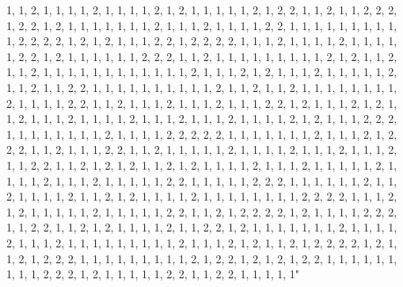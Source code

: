 \documentclass[
]{article}
\begin{document}
\begin{Schunk}
\begin{Soutput}
1, 1, 2, 1, 1, 1, 1, 2, 1, 1, 1, 1, 2, 1, 2, 1, 1, 1, 1, 1, 2, 1, 2, 2, 1, 1, 2, 1, 1, 2, 2, 2, 1, 2, 2, 1, 2, 1, 1, 1, 1, 1, 1, 1, 2, 1, 1, 1, 2, 1, 1, 1, 1, 2, 2, 1, 1, 1, 1, 1, 1, 1, 1, 1, 1, 2, 2, 2, 2, 1, 2, 1, 2, 1, 1, 1, 2, 2, 1, 2, 2, 2, 2, 1, 1, 1, 2, 1, 1, 1, 1, 2, 1, 1, 1, 1, 1, 2, 2, 1, 2, 1, 1, 1, 1, 1, 1, 2, 2, 2, 1, 1, 2, 1, 1, 1, 1, 1, 1, 1, 1, 1, 2, 1, 2, 1, 1, 2, 1, 1, 2, 1, 1, 1, 1, 1, 1, 1, 1, 1, 1, 1, 1, 2, 1, 1, 1, 2, 1, 2, 1, 1, 1, 2, 1, 1, 1, 1, 1, 2, 1, 1, 2, 1, 1, 2, 2, 1, 1, 1, 1, 1, 1, 1, 1, 1, 1, 2, 1, 1, 2, 1, 1, 2, 1, 1, 1, 1, 1, 1, 1, 1, 2, 1, 1, 1, 1, 2, 2, 1, 1, 2, 1, 1, 1, 2, 1, 1, 1, 2, 1, 1, 1, 2, 2, 1, 2, 1, 1, 1, 2, 1, 2, 1, 1, 2, 1, 1, 1, 2, 1, 1, 1, 1, 2, 1, 1, 1, 2, 1, 1, 1, 2, 1, 1, 1, 1, 2, 1, 2, 1, 1, 1, 2, 2, 2, 1, 1, 1, 1, 1, 1, 1, 1, 2, 1, 1, 1, 1, 2, 2, 2, 2, 2, 1, 1, 1, 1, 1, 1, 1, 2, 1, 1, 1, 2, 1, 2, 2, 2, 1, 1, 2, 1, 1, 1, 2, 2, 1, 1, 2, 1, 1, 1, 1, 1, 2, 1, 1, 1, 1, 2, 1, 1, 1, 2, 1, 1, 1, 2, 1, 1, 2, 2, 1, 1, 2, 1, 2, 1, 2, 1, 1, 2, 1, 2, 1, 1, 1, 1, 2, 1, 1, 1, 2, 1, 1, 1, 1, 1, 2, 1, 1, 1, 1, 2, 1, 1, 1, 2, 1, 1, 1, 1, 1, 2, 2, 1, 1, 1, 1, 1, 2, 2, 2, 1, 1, 1, 1, 1, 1, 2, 1, 1, 2, 1, 1, 1, 1, 2, 1, 1, 2, 1, 2, 1, 1, 1, 1, 2, 1, 1, 1, 1, 1, 1, 1, 1, 2, 2, 2, 2, 1, 1, 1, 2, 1, 2, 1, 1, 1, 1, 1, 2, 1, 1, 1, 1, 1, 2, 2, 1, 1, 2, 1, 2, 2, 2, 2, 1, 2, 1, 1, 1, 1, 2, 2, 2, 1, 1, 2, 2, 1, 1, 2, 1, 2, 1, 1, 1, 1, 2, 1, 1, 2, 2, 1, 2, 1, 1, 1, 1, 1, 1, 1, 2, 1, 1, 1, 1, 2, 1, 1, 1, 2, 1, 1, 1, 1, 1, 1, 1, 1, 1, 2, 1, 1, 1, 2, 1, 2, 1, 1, 2, 1, 2, 2, 2, 2, 1, 2, 1, 1, 2, 1, 2, 2, 2, 1, 1, 1, 1, 1, 1, 1, 1, 1, 2, 1, 2, 2, 1, 2, 1, 2, 1, 2, 2, 1, 1, 1, 1, 1, 1, 1, 1, 1, 2, 2, 2, 1, 2, 1, 1, 1, 1, 1, 2, 2, 1, 1, 2, 2, 1, 1, 1, 1, 1" 

\end{Soutput}
\end{Schunk}
\end{document}

